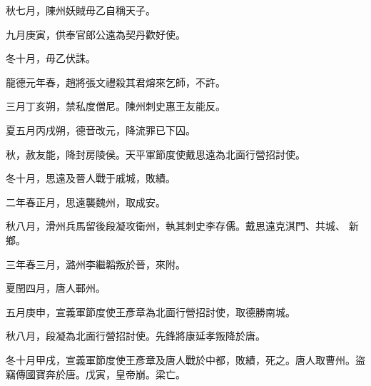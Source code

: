 \begin{pinyinscope}
 秋七月，陳州妖賊毋乙自稱天子。



 九月庚寅，供奉官郎公遠為契丹歡好使。



 冬十月，毋乙伏誅。



 龍德元年春，趙將張文禮殺其君熔來乞師，不許。



 三月丁亥朔，禁私度僧尼。陳州刺史惠王友能反。



 夏五月丙戌朔，德音改元，降流罪已下囚。



 秋，赦友能，降封房陵侯。天平軍節度使戴思遠為北面行營招討使。



 冬十月，思遠及晉人戰于戚城，敗績。



 二年春正月，思遠襲魏州，取成安。



 秋八月，滑州兵馬留後段凝攻衛州，執其刺史李存儒。戴思遠克淇門、共城、
 新鄉。



 三年春三月，潞州李繼韜叛於晉，來附。



 夏閏四月，唐人鄆州。



 五月庚申，宣義軍節度使王彥章為北面行營招討使，取德勝南城。



 秋八月，段凝為北面行營招討使。先鋒將康延孝叛降於唐。



 冬十月甲戌，宣義軍節度使王彥章及唐人戰於中都，敗績，死之。唐人取曹州。盜竊傳國寶奔於唐。戊寅，皇帝崩。梁亡。



\end{pinyinscope}